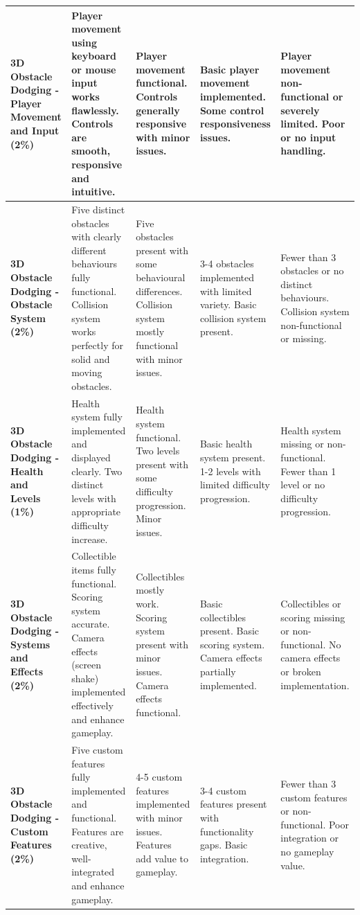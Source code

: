 \documentclass{article}
\begin{document}
\begin{landscape}
\begin{tabular}{|p{5cm}|p{4cm}|p{4cm}|p{4cm}|p{4cm}|}
\textbf{3D Obstacle Dodging - Player Movement and Input (2\%)} & 
Player movement using keyboard or mouse input works flawlessly. Controls are smooth, responsive and intuitive. & 
Player movement functional. Controls generally responsive with minor issues. & 
Basic player movement implemented. Some control responsiveness issues. & 
Player movement non-functional or severely limited. Poor or no input handling. \\ \hline

\textbf{3D Obstacle Dodging - Obstacle System (2\%)} & 
Five distinct obstacles with clearly different behaviours fully functional. Collision system works perfectly for solid and moving obstacles. & 
Five obstacles present with some behavioural differences. Collision system mostly functional with minor issues. & 
3-4 obstacles implemented with limited variety. Basic collision system present. & 
Fewer than 3 obstacles or no distinct behaviours. Collision system non-functional or missing. \\ \hline

\textbf{3D Obstacle Dodging - Health and Levels (1\%)} & 
Health system fully implemented and displayed clearly. Two distinct levels with appropriate difficulty increase. & 
Health system functional. Two levels present with some difficulty progression. Minor issues. & 
Basic health system present. 1-2 levels with limited difficulty progression. & 
Health system missing or non-functional. Fewer than 1 level or no difficulty progression. \\ \hline

\textbf{3D Obstacle Dodging - Systems and Effects (2\%)} & 
Collectible items fully functional. Scoring system accurate. Camera effects (screen shake) implemented effectively and enhance gameplay. & 
Collectibles mostly work. Scoring system present with minor issues. Camera effects functional. & 
Basic collectibles present. Basic scoring system. Camera effects partially implemented. & 
Collectibles or scoring missing or non-functional. No camera effects or broken implementation. \\ \hline

\textbf{3D Obstacle Dodging - Custom Features (2\%)} & 
Five custom features fully implemented and functional. Features are creative, well-integrated and enhance gameplay. & 
4-5 custom features implemented with minor issues. Features add value to gameplay. & 
3-4 custom features present with functionality gaps. Basic integration. & 
Fewer than 3 custom features or non-functional. Poor integration or no gameplay value. \\ \hline


\end{tabular}
\end{landscape}
\end{document}
